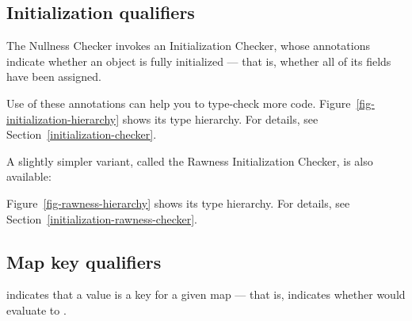 \subsection{Initialization qualifiers\label{initialization-qualifiers-overview}}

The Nullness Checker invokes an Initialization Checker, whose annotations indicate whether
an object is fully initialized --- that is, whether all of its fields have
been assigned.

\begin{description}
\item[]
\item[]
\item[]
\end{description}

\noindent
Use of these annotations can help you to type-check more
code.  Figure~\ref{fig-initialization-hierarchy} shows its type hierarchy.  For
details, see Section~\ref{initialization-checker}.

A slightly simpler variant, called the Rawness Initialization Checker, is also available:

\begin{description}
\item[]
\item[]
\item[]
\end{description}

\noindent
Figure~\ref{fig-rawness-hierarchy} shows its type hierarchy.  For
details, see Section~\ref{initialization-rawness-checker}.


\subsection{Map key qualifiers\label{map-key-qualifiers}}

\begin{description}
\item[]
\end{description}
    indicates that a value is a key for a given map --- that is, indicates
    whether  would evaluate to .

